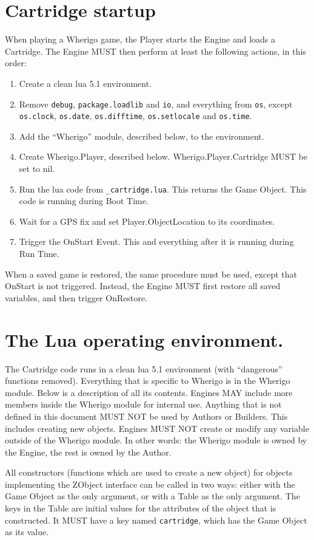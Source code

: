\documentclass{article}
\begin{document}
\section{Cartridge startup}
When playing a Wherigo game, the Player starts the Engine and loads a
Cartridge. The Engine MUST then perform at least the following actions, in this
order:

\begin{enumerate}
\item Create a clean lua 5.1 environment.
\item Remove \verb-debug-, \verb-package.loadlib- and \verb-io-, and everything
	from \verb-os-, except \verb-os.clock-, \verb-os.date-,
	\verb-os.difftime-, \verb-os.setlocale- and \verb-os.time-.
\item Add the ``Wherigo'' module, described below, to the environment.
\item Create Wherigo.Player, described below. Wherigo.Player.Cartridge MUST be set to nil.
\item Run the lua code from \verb-_cartridge.lua-. This returns the Game Object. This code is running during Boot Time.
\item Wait for a GPS fix and set Player.ObjectLocation to its coordinates.
\item Trigger the OnStart Event. This and everything after it is running during Run Time.
\end{enumerate}

When a saved game is restored, the same procedure must be used, except that
OnStart is not triggered.  Instead, the Engine MUST first restore all saved
variables, and then trigger OnRestore.

\section{The Lua operating environment.}

The Cartridge code runs in a clean lua 5.1 environment (with ``dangerous''
functions removed). Everything that is specific to Wherigo is in the Wherigo
module. Below is a description of all its contents. Engines MAY include more
members inside the Wherigo module for internal use. Anything that is not
defined in this document MUST NOT be used by Authors or Builders. This includes
creating new objects. Engines MUST NOT create or modify any variable outside of
the Wherigo module. In other words: the Wherigo module is owned by the Engine,
the rest is owned by the Author.

All constructors (functions which are used to create a new object) for objects
implementing the ZObject interface can be called in two ways: either with the
Game Object as the only argument, or with a Table as the only argument. The
keys in the Table are initial values for the attributes of the object that is
constructed.  It MUST have a key named \verb-cartridge-, which has the Game
Object as its value.
\end{document}
